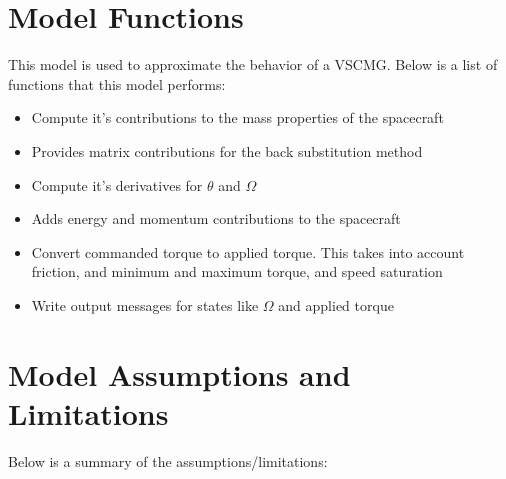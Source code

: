 \section{Model Functions}

This model is used to approximate the behavior of a VSCMG. Below is a list of functions that this model performs:

\begin{itemize}
	\item Compute it's contributions to the mass properties of the spacecraft
	\item Provides matrix contributions for the back substitution method
	\item Compute it's derivatives for $\theta$ and $\Omega$
	\item Adds energy and momentum contributions to the spacecraft
	\item Convert commanded torque to applied torque. This takes into account friction, and minimum and maximum torque, and speed saturation
	\item Write output messages for states like $\Omega$ and applied torque
\end{itemize}

\section{Model Assumptions and Limitations}
Below is a summary of the assumptions/limitations:

